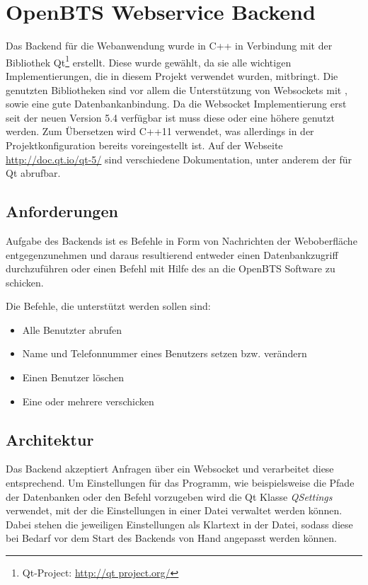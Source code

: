 \section{OpenBTS Webservice Backend}
\label{sec:backend}
Das Backend für die Webanwendung wurde in C++ in Verbindung mit der Bibliothek Qt\footnote{Qt-Project: \url{http://qt project.org/}} erstellt. Diese wurde gewählt, da sie alle wichtigen Implementierungen, die in diesem Projekt verwendet wurden, mitbringt. Die genutzten Bibliotheken sind vor allem die Unterstützung von Websockets mit \JSON, sowie eine gute Datenbankanbindung. Da die Websocket Implementierung erst seit der neuen Version 5.4 verfügbar ist muss diese oder eine höhere genutzt werden. Zum Übersetzen wird C++11 verwendet, was allerdings in der Projektkonfiguration bereits voreingestellt ist. Auf der Webseite \url{http://doc.qt.io/qt-5/} sind verschiedene Dokumentation, unter anderem der \API für Qt abrufbar.

\subsection{Anforderungen}

Aufgabe des Backends ist es Befehle in Form von \JSON Nachrichten der Weboberfläche entgegenzunehmen und daraus resultierend entweder einen Datenbankzugriff durchzuführen oder einen Befehl mit Hilfe des \CLI an die OpenBTS Software zu schicken.

Die Befehle, die unterstützt werden sollen sind:

\begin{itemize}
	\item Alle Benutzter abrufen
	\item Name und Telefonnummer eines Benutzers setzen bzw. verändern
	\item Einen Benutzer löschen
	\item Eine oder mehrere \SMS verschicken
\end{itemize}

\subsection{Architektur}

Das Backend akzeptiert \JSON Anfragen über ein Websocket und verarbeitet diese entsprechend. Um Einstellungen für das Programm, wie beispielsweise die Pfade der Datenbanken oder den \SMS Befehl vorzugeben wird die Qt Klasse \textit{QSettings} verwendet, mit der die Einstellungen in einer Datei verwaltet werden können. Dabei stehen die jeweiligen Einstellungen als Klartext in der Datei, sodass diese bei Bedarf vor dem Start des Backends von Hand angepasst werden können.

